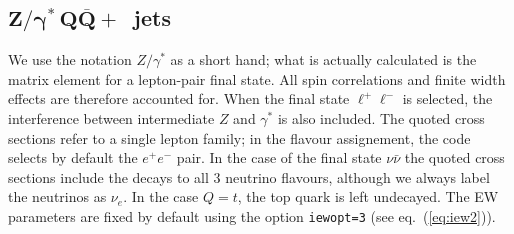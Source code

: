 \documentclass[paper]{JHEP3}
\def    \Qbar   {\overline{Q}}
\begin{document}
\subsection{$\mathbf{Z/\gamma^{*} \, Q\Qbar+}$~jets}
\label{sec:zqq}
We use the notation $Z/\gamma^{*}$ as a short hand; what is actually
calculated is the matrix element for a lepton-pair final state. All
spin correlations and finite width effects are therefore accounted
for. When the final state $\ell^+ \ell^-$ is selected, the
interference between intermediate $Z$ and $\gamma^{*}$ is also included.
The quoted cross sections refer to a single lepton family; in the
flavour assignement, the code selects by default the $e^+ e^-$ pair.
In the case of the final state $\nu \bar\nu$ the quoted cross sections
include the decays to all 3 neutrino flavours, although we always
label the neutrinos as $\nu_e$.  In the case $Q=t$, the top quark is
left undecayed.
The EW parameters are fixed by default using the option {\tt iewopt=3}
(see eq.~(\ref{eq:iew2})).
\end{document}
